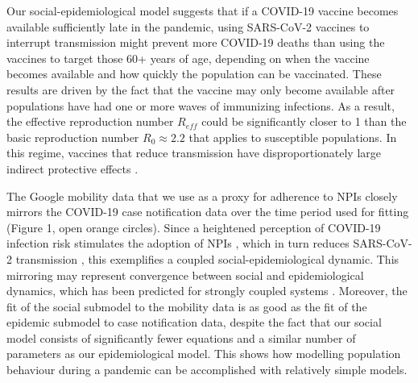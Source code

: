 Our social-epidemiological model suggests that if a COVID-19 vaccine becomes available sufficiently late in the pandemic, using SARS-CoV-2 vaccines to interrupt transmission might prevent more COVID-19 deaths than using the vaccines to target those 60+ years of age, depending on when the vaccine becomes available and how quickly the population can be vaccinated. These results are driven by the fact that the vaccine may only become available after populations have had one or more waves of immunizing infections. As a result, the effective reproduction number $R_{eff}$ could be significantly closer to 1 than the basic reproduction number $R_0 \approx 2.2$ that applies to susceptible populations. In this regime, vaccines that reduce transmission have disproportionately large indirect protective effects \cite{anderson1992infectious}.

The Google mobility data that we use as a proxy for adherence to NPIs closely mirrors the COVID-19 case notification data over the time period used for fitting (Figure 1, open orange circles).  Since a heightened perception of COVID-19 infection risk stimulates the adoption of NPIs \cite{wise2020changes}, which in turn reduces SARS-CoV-2 transmission \cite{anderson2020estimating, peak2020individual}, this exemplifies a coupled  social-epidemiological dynamic. This mirroring may represent convergence between social and epidemiological dynamics, which has been predicted for strongly coupled systems \cite{sigdel2019convergence}. Moreover, the fit of the social submodel to the mobility data is as good as the fit of the epidemic submodel to case notification data, despite the fact that our social model consists of significantly fewer equations and a similar number of parameters as our epidemiological model. This shows how modelling population behaviour during a pandemic can be accomplished with relatively simple models. 

